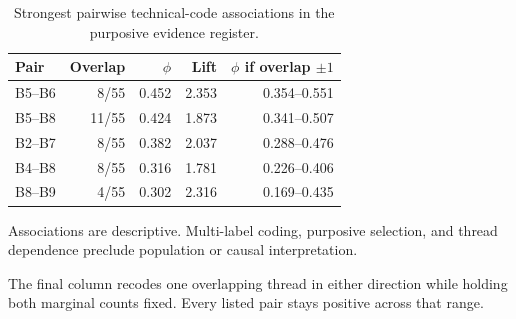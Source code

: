\begin{table}[t]
\centering
\caption{Strongest pairwise technical-code associations in the purposive evidence register.}
\label{tab:associations}
\begin{threeparttable}
\begin{tabular}{@{}lrrrr@{}}
\toprule
Pair & Overlap & $\phi$ & Lift & $\phi$ if overlap $\pm1$ \\
\midrule
B5--B6 & 8/55 & 0.452 & 2.353 & 0.354--0.551 \\
B5--B8 & 11/55 & 0.424 & 1.873 & 0.341--0.507 \\
B2--B7 & 8/55 & 0.382 & 2.037 & 0.288--0.476 \\
B4--B8 & 8/55 & 0.316 & 1.781 & 0.226--0.406 \\
B8--B9 & 4/55 & 0.302 & 2.316 & 0.169--0.435 \\
\bottomrule
\end{tabular}
\begin{tablenotes}[flushleft]\footnotesize
\item Associations are descriptive. Multi-label coding, purposive selection, and thread dependence preclude population or causal interpretation.
\item The final column recodes one overlapping thread in either direction while holding both marginal counts fixed. Every listed pair stays positive across that range.
\end{tablenotes}
\end{threeparttable}
\end{table}
